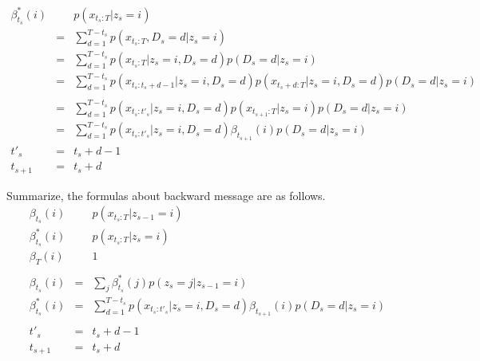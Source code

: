\documentclass[a4paper]{article}
\DeclareMathOperator{\defeq}{\ensuremath{\stackrel{\mathrm{def}}{=}}}
\begin{document}
\begin{eqnarray}
	\beta_{t_s}^{*}(i)
	&\defeq&
	p(x_{t_s:T} | z_s = i) \\
	&=&
	\sum_{d=1}^{T-t_s}{p(x_{t_s:T}, D_s = d | z_s = i)} \\
	&=&
	\sum_{d=1}^{T-t_s}{p(x_{t_s:T} | z_s = i, D_s = d) p(D_s = d  | z_s = i)} \\
	&=&
	\sum_{d=1}^{T-t_s}{p(x_{t_s:t_s+d-1} | z_s = i, D_s = d) p(x_{t_s+d:T} | z_s = i, D_s = d) p(D_s = d  | z_s = i)} \nonumber \\ \\
	&=&
	\sum_{d=1}^{T-t_s}{p(x_{t_s:t'_s} | z_s = i, D_s = d) p(x_{t_{s+1}:T} | z_s = i) p(D_s = d  | z_s = i)} \\
	&=&
	\sum_{d=1}^{T-t_s}{p(x_{t_s:t'_s} | z_s = i, D_s = d) \beta_{t_{s+1}}(i) p(D_s = d  | z_s = i)}\\
t'_s &=& t_s + d - 1 \\
t_{s+1} &=& t_s + d
\end{eqnarray}

Summarize, the formulas about backward message are as follows.
\begin{eqnarray}
	\beta_{t_s}(i)
	&\defeq&
	p(x_{t_s:T} | z_{s-1} = i) \\
	\beta_{t_s}^{*}(i)
	&\defeq&
	p(x_{t_s:T} | z_s = i) \\
	\beta_{T}(i)
	&\defeq&
	1 \\
	\nonumber \\
	\beta_{t_s}(i)
	&=&
	\sum_{j}{\beta_{t_s}^{*}(j) p(z_s = j | z_{s-1} = i)} \\
	\beta_{t_s}^{*}(i)
	&=&
	\sum_{d=1}^{T-t_s}{p(x_{t_s:t'_s} | z_s = i, D_s = d) \beta_{t_{s+1}}(i) p(D_s = d  | z_s = i)} \\
	\nonumber \\
	t'_s &=& t_s + d - 1 \\
	t_{s+1} &=& t_s + d
\end{eqnarray}
\end{document}
